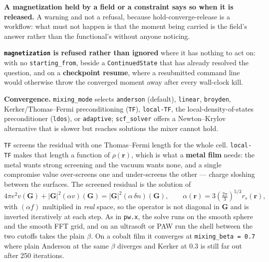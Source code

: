 \documentclass[11pt,a4paper]{article}
\newcommand{\code}[1]{\texttt{\small #1}}
\begin{document}
\begin{refuses}
\textbf{A magnetization held by a field or a constraint says so when it is
released.} A warning and not a refusal, because hold-converge-release is a
workflow: what must not happen is that the moment being carried is the field's
answer rather than the functional's without anyone noticing.

\textbf{\code{magnetization} is refused rather than ignored} where it has
nothing to act on: with no \code{starting\_from}, beside a
\code{ContinuedState} that has already resolved the question, and on a
\textbf{checkpoint resume}, where a resubmitted command line would otherwise
throw the converged moment away after every wall-clock kill.
\end{refuses}

\textbf{Convergence.} \code{mixing\_mode} selects \code{anderson} (default),
\code{linear}, \code{broyden}, Kerker/Thomas--Fermi preconditioning (\code{TF}),
\code{local-TF}, the local-density-of-states preconditioner (\code{ldos}), or
\code{adaptive}; \code{scf\_solver} offers a Newton--Krylov
alternative that is slower but reaches solutions the mixer cannot hold.

\code{TF} screens the residual with one Thomas--Fermi length for the whole cell.
\code{local-TF} makes that length a function of $\rho(\mathbf r)$, which is what
a \textbf{metal film} needs: the metal wants strong screening and the vacuum wants
none, and a single compromise value over-screens one and under-screens the other
--- charge sloshing between the surfaces. The screened residual is the solution
of
\begin{equation*}
  4\pi e^2 v(\mathbf G) + |\mathbf G|^2 (\alpha v)(\mathbf G)
    = |\mathbf G|^2 (\alpha\,\delta n)(\mathbf G),
  \qquad \alpha(\mathbf r) = 3\left(\tfrac{2\pi}{3}\right)^{5/3} r_s(\mathbf r),
\end{equation*}
with $(\alpha f)$ multiplied in \emph{real} space, so the operator is not
diagonal in $\mathbf G$ and is inverted iteratively at each step. As in
\code{pw.x}, the solve runs on the smooth sphere and the smooth FFT grid, and on an
ultrasoft or PAW run the shell between the two cutoffs takes the plain $\beta$. On a cobalt
film it converges at \code{mixing\_beta = 0.7} where plain Anderson at the same
$\beta$ diverges and Kerker at $0.3$ is still far out after 250 iterations.
\end{document}
